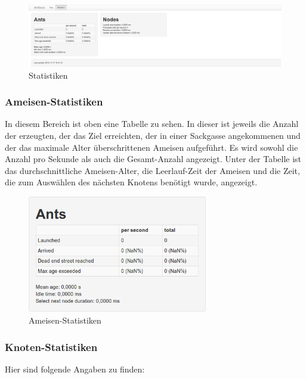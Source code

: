 \begin{figure}[htbp]
  \centering
  \includegraphics[width=\textwidth]{Bilder/Statistiken.png}
  \caption{Statistiken}
  \label{fig:statistiken}
\end{figure}

\subsubsection{Ameisen-Statistiken}
\label{sec:ameisen-statistiken}

In diesem Bereich ist oben eine Tabelle zu sehen.
In dieser ist jeweils die Anzahl der erzeugten, der das Ziel erreichten, der in einer Sackgasse angekommenen und der das maximale Alter überschrittenen Ameisen aufgeführt.
Es wird sowohl die Anzahl pro Sekunde als auch die Gesamt-Anzahl angezeigt.
Unter der Tabelle ist das durchschnittliche Ameisen-Alter, die Leerlauf-Zeit der Ameisen und die Zeit, die zum Auswählen des nächsten Knotens benötigt wurde, angezeigt.

\begin{figure}[htbp]
  \centering
  \includegraphics[width=0.7\textwidth]{Bilder/Ameisen-Statistiken.png}
  \caption{Ameisen-Statistiken}
  \label{fig:ameisen-statistiken}
\end{figure}

\subsubsection{Knoten-Statistiken}
\label{sec:Knoten-statistiken}

Hier sind folgende Angaben zu finden:

